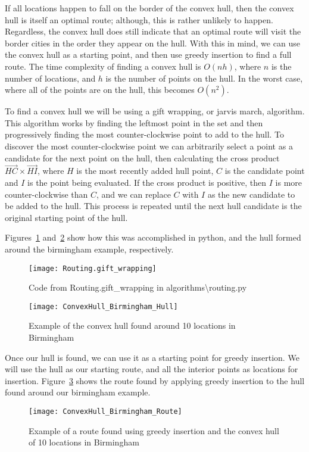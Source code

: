 \noindent
If all locations happen to fall on the border of the convex hull, then the convex hull is itself an optimal route;
although, this is rather unlikely to happen.
Regardless, the convex hull does still indicate that an optimal route will visit the border cities in the order they
appear on the hull\parencite[p. 46]{applegate2006traveling}.
With this in mind, we can use the convex hull as a starting point, and then use greedy insertion to find a full route.
The time complexity of finding a convex hull is $O(nh)$, where $n$ is the number of locations, and $h$ is the number
of points on the hull. In the worst case, where all of the points are on the hull, this becomes $O(n^2)$.

To find a convex hull we will be using a gift wrapping, or jarvis march, algorithm.
This algorithm works by finding the leftmost point in the set and then progressively finding the most counter-clockwise
point to add to the hull.
To discover the most counter-clockwise point we can arbitrarily select a point as a candidate for the next point on
the hull, then calculating the cross product $\vec{HC} \times \vec{HI}$, where $H$ is the most recently added hull
point, $C$ is the candidate point and $I$ is the point being evaluated.
If the cross product is positive, then $I$ is more counter-clockwise than $C$, and we can replace $C$ with $I$ as
the new candidate to be added to the hull.
This process is repeated until the next hull candidate is the original starting point of the hull.

Figures~\ref{fig:Routing.gift_wrapping} and~\ref{fig:ConvexHull_Birmingham_Hull} show how this was accomplished in
python, and the hull formed around the birmingham example, respectively.
\begin{figure}[H]
    \centering
    \texttt{[image: Routing.gift\_wrapping]}
    \caption{Code from Routing.gift\_wrapping in algorithms\textbackslash routing.py}
    \label{fig:Routing.gift_wrapping}
\end{figure}
\begin{figure}[H]
    \centering
    \texttt{[image: ConvexHull\_Birmingham\_Hull]}
    \caption{Example of the convex hull found around 10 locations in Birmingham}
    \label{fig:ConvexHull_Birmingham_Hull}
\end{figure}

\noindent
Once our hull is found, we can use it as a starting point for greedy insertion.
We will use the hull as our starting route, and all the interior points as locations for insertion.
Figure~\ref{fig:ConvexHull_Birmingham_Route} shows the route found by applying greedy insertion to the hull found
around our birmingham example.
\begin{figure}[H]
    \centering
    \texttt{[image: ConvexHull\_Birmingham\_Route]}
    \caption{Example of a route found using greedy insertion and the convex hull of 10 locations in Birmingham}
    \label{fig:ConvexHull_Birmingham_Route}
\end{figure}

